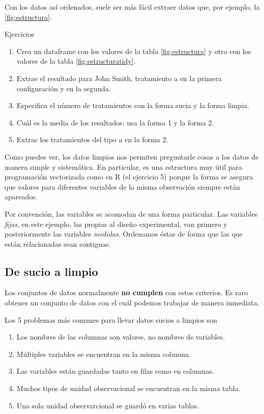 \documentclass[]{article}
\providecommand{\tightlist}{%
  \setlength{\itemsep}{0pt}\setlength{\parskip}{0pt}}
\begin{document}
Con los datos así ordenados, suele ser más fácil extraer datos que, por
ejemplo, la \ref{fig:estructura}.

\renewcommand\bcStyleTitre[1]{\large\textcolor{bbblack}{#1}}

\begin{bclogo}[
  couleur=llred,
  arrondi=0,
  logo=\bcstop,
  barre=none,
  noborder=true]{Ejercicios}
\begin{enumerate}
\item Crea un dataframe con los valores de la tabla \ref{fig:estructura} y otro 
con los valores de la tabla \ref{fig:estructuratidy}.
\item Extrae el resultado para John Smith, tratamiento a en la primera configuración y en la segunda.
\item Especifica el número de tratamientos con la forma sucia y la forma limpia.
\item Cuál es la media de los resultados: usa la forma 1 y la forma 2.
\item Extrae los tratamientos del tipo a en la forma 2.
\end{enumerate}

\end{bclogo}

Como puedes ver, los datos limpios nos permiten preguntarle cosas a los
datos de manera simple y sistemática. En particular, es una estructura
muy útil para programación vectorizada como en R (el ejercicio 5) porque
la forma se asegura que valores para diferentes variables de la misma
observación siempre están apareados.

Por convención, las variables se acomodan de una forma particular. Las
variables \emph{fijas}, en este ejemplo, las propias al diseño
experimental, van primero y posteriormente las variables \emph{medidas}.
Ordenamos éstas de forma que las que están relacionadas sean contiguas.

\subsection{De sucio a limpio}\label{de-sucio-a-limpio}

Los conjuntos de datos normalmente \textbf{no cumplen} con estos
criterios. Es raro obtener un conjunto de datos con el cuál podemos
trabajar de manera inmediata.

Los 5 problemas más comunes para llevar datos sucios a limpios son

\begin{enumerate}
\def\labelenumi{\arabic{enumi}.}
\tightlist
\item
  Los nombres de las columnas son valores, no nombres de variables.
\item
  Múltiples variables se encuentran en la misma columna.
\item
  Las variables están guardadas tanto en filas como en columnas.
\item
  Muchos tipos de unidad observacional se encuentran en la misma tabla.
\item
  Una sola unidad observarcional se guardó en varias tablas.
\end{enumerate}
\end{document}
